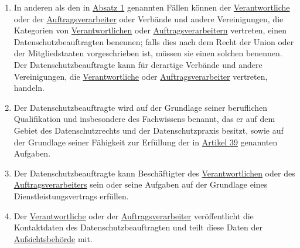 \begin{enumerate}
  \item In anderen als den in \hyperref[itm:37-1]{Absatz 1} genannten Fällen können der \hyperref[itm:04-7]
   {Verantwortliche} oder der
   \hyperref[itm:04-8]{Auftragsverarbeiter} oder Verbände und andere Vereinigungen, die Kategorien von \hyperref
    [itm:04-7]{Verantwortlichen} oder
   \hyperref[itm:04-8]{Auftragsverarbeitern} vertreten, einen Datenschutzbeauftragten benennen; falls dies nach dem
    Recht der Union oder der Mitgliedstaaten vorgeschrieben ist, müssen sie einen solchen benennen. Der
    Datenschutzbeauftragte kann für derartige Verbände und andere Vereinigungen, die \hyperref[itm:04-7]
    {Verantwortliche} oder \hyperref[itm:04-8]{Auftragsverarbeiter} vertreten, handeln.
  \label{itm:37-4}

  \item Der Datenschutzbeauftragte wird auf der Grundlage seiner beruflichen Qualifikation und insbesondere des
   Fachwissens benannt, das er auf dem Gebiet des Datenschutzrechts und der Datenschutzpraxis besitzt, sowie auf der
   Grundlage seiner Fähigkeit zur Erfüllung der in \hyperref[ch:39]{Artikel 39} genannten Aufgaben.
  \label{itm:37-5}

  \item Der Datenschutzbeauftragte kann Beschäftigter des \hyperref[itm:04-7]{Verantwortlichen} oder des \hyperref
   [itm:04-8]{Auftragsverarbeiters} sein oder seine Aufgaben auf der Grundlage eines Dienstleistungsvertrags erfüllen.
  \label{itm:37-6}

  \item Der \hyperref[itm:04-7]{Verantwortliche} oder der \hyperref[itm:04-8]{Auftragsverarbeiter} veröffentlicht die
   Kontaktdaten des Datenschutzbeauftragten und teilt diese Daten der \hyperref[itm:04-21]{Aufsichtsbehörde} mit.
  \label{itm:37-7}

\end{enumerate}


